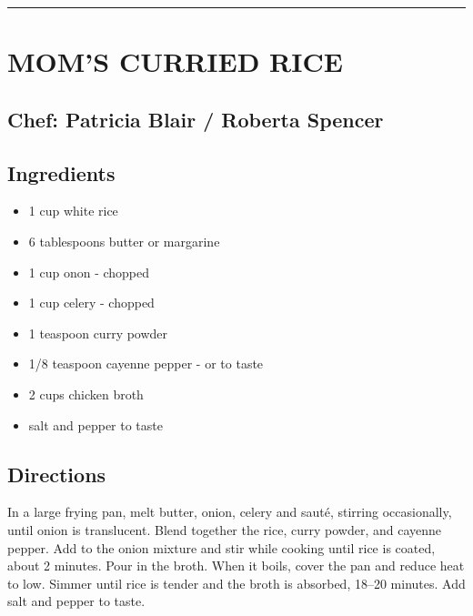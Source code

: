 \documentclass[
]{book}
\providecommand{\tightlist}{%
  \setlength{\itemsep}{0pt}\setlength{\parskip}{0pt}}
\begin{document}
\begin{center}\rule{0.5\linewidth}{0.5pt}\end{center}

\hypertarget{moms-curried-rice}{%
\section*{MOM'S CURRIED RICE}\label{moms-curried-rice}}


\hypertarget{chef-patricia-blair-roberta-spencer}{%
\subsection*{Chef: Patricia Blair / Roberta Spencer}\label{chef-patricia-blair-roberta-spencer}}


\hypertarget{ingredients-33}{%
\subsection*{Ingredients}\label{ingredients-33}}


\begin{itemize}
\tightlist
\item
  1 cup white rice
\item
  6 tablespoons butter or margarine
\item
  1 cup onon - chopped
\item
  1 cup celery - chopped
\item
  1 teaspoon curry powder
\item
  1/8 teaspoon cayenne pepper - or to taste
\item
  2 cups chicken broth
\item
  salt and pepper to taste
\end{itemize}

\hypertarget{directions-33}{%
\subsection*{Directions}\label{directions-33}}


In a large frying pan, melt butter, onion, celery and sauté, stirring occasionally, until onion is translucent. Blend together the rice, curry powder, and cayenne pepper. Add to the onion mixture and stir while cooking until rice is coated, about 2 minutes. Pour in the broth. When it boils, cover the pan and reduce heat to low. Simmer until rice is tender and the broth is absorbed, 18--20 minutes. Add salt and pepper to taste.
\end{document}
